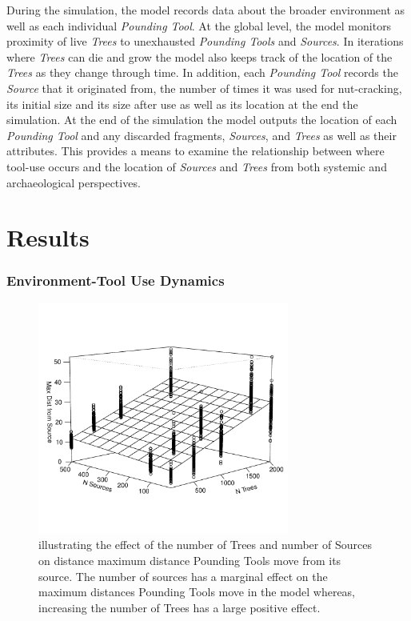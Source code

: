 \documentclass[9pt,twocolumn,twoside,]{pnas-new}
\begin{document}
During the simulation, the model records data about the broader
environment as well as each individual \emph{Pounding Tool}. At the
global level, the model monitors proximity of live \emph{Trees} to
unexhausted \emph{Pounding Tools} and \emph{Sources}. In iterations
where \emph{Trees} can die and grow the model also keeps track of the
location of the \emph{Trees} as they change through time. In addition,
each \emph{Pounding Tool} records the \emph{Source} that it originated
from, the number of times it was used for nut-cracking, its initial size
and its size after use as well as its location at the end the
simulation. At the end of the simulation the model outputs the location
of each \emph{Pounding Tool} and any discarded fragments,
\emph{Sources}, and \emph{Trees} as well as their attributes. This
provides a means to examine the relationship between where tool-use
occurs and the location of \emph{Sources} and \emph{Trees} from both
systemic and archaeological perspectives.

\hypertarget{results}{%
\section{Results}\label{results}}

\hypertarget{environment-tool-use-dynamics}{%
\subsubsection{Environment-Tool Use
Dynamics}\label{environment-tool-use-dynamics}}

\begin{figure}
\includegraphics[width=3.25in]{Reeves_et_al_2021_Panda_ABM_files/figure-latex/figure 1-1.pdf}
\caption{illustrating the effect of the number of Trees and number of Sources on distance maximum distance Pounding Tools move from its source. The number of sources has a marginal effect on the maximum distances Pounding Tools move in the model whereas, increasing the number of Trees has a large positive effect.}
\label{d2source}
\end{figure}
\end{document}
